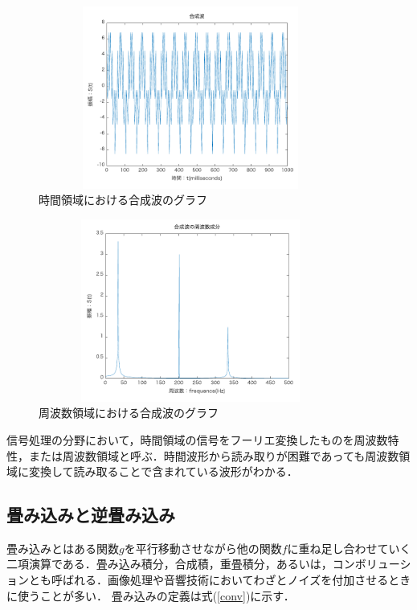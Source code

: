 \documentclass[a4j,11pt]{jsarticle}
\begin{document}
\begin{figure}[htb]
\begin{center}
 \includegraphics[clip,width=100mm,height=60mm]{sannkakuha.pdf}
\end{center}
 \caption{時間領域における合成波のグラフ}
 \label{fig:jikanryouiki}
\end{figure}
\begin{figure}[htb]
\begin{center}
 \includegraphics[clip,width=100mm,height=60mm]{sankakuhasyuhasu.pdf}
\end{center}
 \caption{周波数領域における合成波のグラフ}
 \label{fig:syuhasuryouiki}
\end{figure}

信号処理の分野において，時間領域の信号をフーリエ変換したものを周波数特性，または周波数領域と呼ぶ．時間波形から読み取りが困難であっても周波数領域に変換して読み取ることで含まれている波形がわかる．

\subsection{畳み込みと逆畳み込み}
畳み込みとはある関数$g$を平行移動させながら他の関数$f$に重ね足し合わせていく二項演算である．畳み込み積分，合成積，重畳積分，あるいは，コンボリューションとも呼ばれる．画像処理や音響技術においてわざとノイズを付加させるときに使うことが多い．
畳み込みの定義は式(\ref{conv})に示す．
\end{document}
